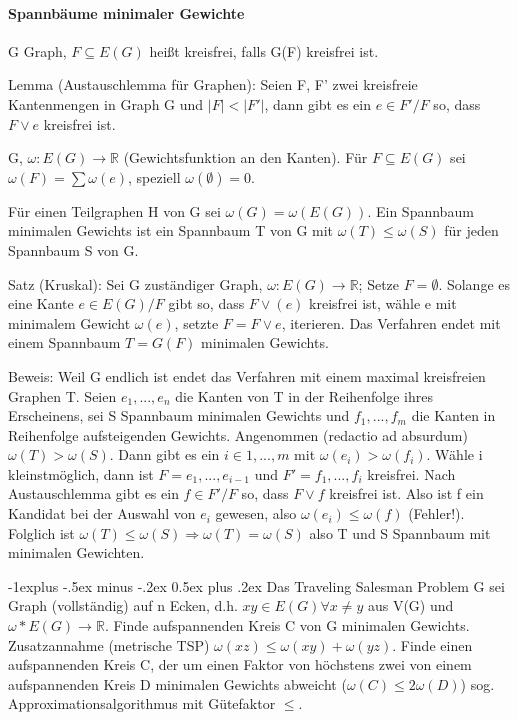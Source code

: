 \documentclass[10pt,landscape]{article}
\makeatletter
\renewcommand{\subsection}{\@startsection{subsection}{2}{0mm}%
                                {-1explus -.5ex minus -.2ex}%
                                {0.5ex plus .2ex}%
                                {\normalfont\normalsize\bfseries}}
\makeatother
\begin{document}
\begin{multicols}{3}
\paragraph{Spannbäume minimaler Gewichte}
G Graph, $F \subseteq E(G)$ heißt kreisfrei, falls G(F) kreisfrei ist.

Lemma (Austauschlemma für Graphen):
Seien F, F' zwei kreisfreie Kantenmengen in Graph G und $|F|<|F'|$, dann gibt es ein $e \in F'/F$ so, dass $F\vee {e}$ kreisfrei ist.

G, $\omega:E(G)\rightarrow \mathbb{R}$ (Gewichtsfunktion an den Kanten). Für $F\subseteq E(G)$ sei $\omega (F)=\sum \omega (e)$, speziell $\omega (\emptyset)=0$.

Für einen Teilgraphen H von G sei $\omega (G)=\omega (E(G))$. Ein Spannbaum minimalen Gewichts ist ein Spannbaum T von G mit $\omega (T)\leq \omega (S)$ für jeden Spannbaum S von G.

Satz (Kruskal): Sei G zuständiger Graph, $\omega:E(G)\rightarrow \mathbb{R}$; Setze $F=\emptyset$. Solange es eine Kante $e\in E(G)/F$ gibt so, dass $F \vee (e)$ kreisfrei ist, wähle e mit minimalem Gewicht $\omega(e)$, setzte $F=F\vee {e}$, iterieren. Das Verfahren endet mit einem Spannbaum $T=G(F)$ minimalen Gewichts.

Beweis: Weil G endlich ist endet das Verfahren mit einem maximal kreisfreien Graphen T. Seien $e_1,...,e_n$ die Kanten von T in der Reihenfolge ihres Erscheinens, sei S Spannbaum minimalen Gewichts und $f_1,...,f_m$ die Kanten in Reihenfolge aufsteigenden Gewichts. Angenommen (redactio ad absurdum) $\omega(T)>\omega(S)$. Dann gibt es ein $i\in{1,...,m}$ mit $\omega(e_i)>\omega(f_i)$. Wähle i kleinstmöglich, dann ist $F={e_1,...,e_{i-1}}$ und $F'={f_1,...,f_i}$ kreisfrei. Nach Austauschlemma gibt es ein $f\in F'/F$ so, dass $F\vee {f}$ kreisfrei ist. Also ist f ein Kandidat bei der Auswahl von $e_i$ gewesen, also $\omega(e_i)\leq \omega(f)$ (Fehler!). Folglich ist $\omega(T)\leq \omega(S) \Rightarrow \omega(T)=\omega(S)$ also T und S Spannbaum mit minimalen Gewichten.

\subsection{Das Traveling Salesman Problem}
G sei Graph (vollständig) auf n Ecken, d.h. $xy\in E(G) \forall x\not =y$ aus V(G) und $\omega*E(G)\rightarrow \mathbb{R}$. Finde aufspannenden Kreis C von G minimalen Gewichts. Zusatzannahme (metrische TSP) $\omega(xz)\leq \omega(xy)+\omega(yz)$. 
Finde einen aufspannenden Kreis C, der um einen Faktor von höchstens zwei von einem aufspannenden Kreis D minimalen Gewichts abweicht ($\omega(C)\leq 2 \omega(D)$) sog. Approximationsalgorithmus mit Gütefaktor $\leq$.


\end{multicols}
\end{document}
